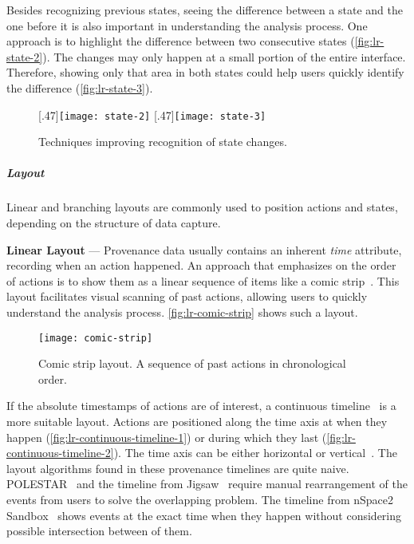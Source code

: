 Besides recognizing previous states, seeing the difference between a state and the one before it is also important in understanding the analysis process. One approach is to highlight the difference between two consecutive states (\autoref{fig:lr-state-2}). The changes may only happen at a small portion of the entire interface. Therefore, showing only that area in both states could help users quickly identify the difference (\autoref{fig:lr-state-3}).

\begin{figure}
\centering
{}[.47\columnwidth]{\texttt{[image: state-2]}}
\hfill
{}[.47\columnwidth]{\texttt{[image: state-3]}}
\caption{Techniques improving recognition of state changes.}
\end{figure}

\subparagraph{Layout} Linear and branching layouts are commonly used to position actions and states, depending on the structure of data capture.

\textbf{Linear Layout} --- Provenance data usually contains an inherent \emph{time} attribute, recording when an action happened. An approach that emphasizes on the order of actions is to show them as a linear sequence of items like a comic strip~\cite{Kurlander1988,Meng1998}. This layout facilitates visual scanning of past actions, allowing users to quickly understand the analysis process. \autoref{fig:lr-comic-strip} shows such a layout.

\begin{figure}
	\centering
	\texttt{[image: comic-strip]}
	\caption[Comic strip layout]{Comic strip layout. A sequence of past actions in chronological order. }
	\label{fig:lr-comic-strip}
\end{figure}

If the absolute timestamps of actions are of interest, a continuous timeline~\cite{Derthick2001} is a more suitable layout. Actions are positioned along the time axis at when they happen (\autoref{fig:lr-continuous-timeline-1}) or during which they last (\autoref{fig:lr-continuous-timeline-2}). The time axis can be either horizontal or vertical~\cite{SandboxTimeline2012}. The layout algorithms found in these provenance timelines are quite naive. POLESTAR~\cite{Pioch2006} and the timeline from Jigsaw~\cite{Liu2010} require manual rearrangement of the events from users to solve the overlapping problem. The timeline from nSpace2 Sandbox~\cite{SandboxTimeline2012} shows events at the exact time when they happen without considering possible intersection between of them.


